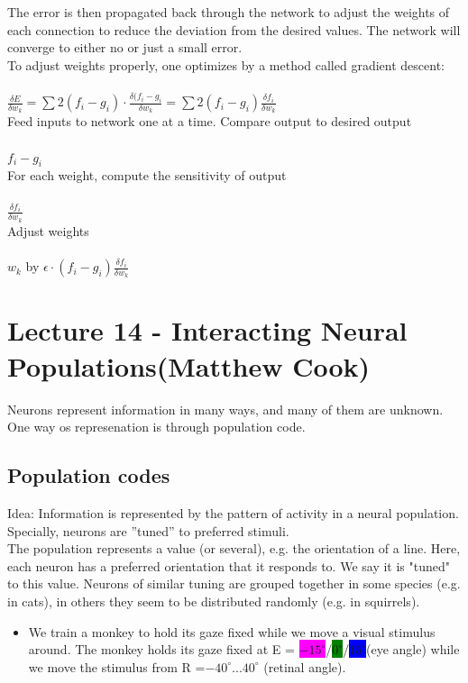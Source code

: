 \documentclass[english,11pt]{article}
\begin{document}
The error is then propagated back through the network to adjust the weights of each connection to reduce the deviation from the desired values. The network will converge to either no or just a small error.\\[2\baselineskip]
To adjust weights properly, one optimizes by a method called gradient descent:\\\\
$\frac{\delta E}{\delta w_k} = \sum 2(f_i - g_i) \cdot \frac{\delta(f_i - g_i}{\delta w_k} = \sum 2(f_i - g_i) \frac{\delta f_i}{\delta w_k}$\\[2\baselineskip]
Feed inputs to network one at a time. Compare output to desired output \\\\$f_i - g_i$\\[2\baselineskip]
For each weight, compute the sensitivity of output \\\\$\frac{\delta f_i}{\delta w_k}$\\[2\baselineskip]
Adjust weights \\\\$w_k$ by $\epsilon \cdot (f_i - g_i) \frac{\delta f_i}{\delta w_k}$






\section{Lecture 14 - Interacting Neural Populations(Matthew Cook)}
Neurons represent information in many ways, and many of them are unknown. One way os represenation is through population code.

\subsection{Population codes}
Idea: Information is represented by the pattern of activity in a neural population. Specially, neurons are ''tuned'' to preferred stimuli.\\
The population represents a value (or several), e.g. the orientation of a line. Here, each neuron has a preferred orientation that it responds to. We say it is "tuned" to this value. Neurons of similar tuning are grouped together in some species (e.g. in cats), in others they seem to be distributed randomly (e.g. in squirrels).
\begin{itemize}[label={}]
\item We train a monkey to hold its gaze fixed while we move a visual stimulus around. The monkey holds its gaze fixed at E = \colorbox{magenta}{$-15^\circ$}/\colorbox{green}{$0^\circ$}/\colorbox{blue}{$15^\circ$}(eye angle) while we move the stimulus from R =$-40^\circ ... 40^\circ$ (retinal angle).
\end{itemize}
\end{document}
